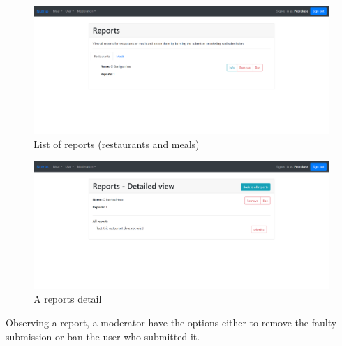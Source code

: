 \begin{figure}[H]
    \begin{center}
        \includegraphics[scale=0.1, width=\textwidth]{_figures/reports.png}
        \caption{List of reports (restaurants and meals)} 
    \end{center}
\end{figure}

\begin{figure}[H]
    \begin{center}
        \includegraphics[scale=0.1, width=\textwidth]{_figures/detailed-report.png}
        \caption{A reports detail} 
    \end{center}
\end{figure}

Observing a report, a moderator have the options either to remove the faulty submission or ban
the user who submitted it.\\